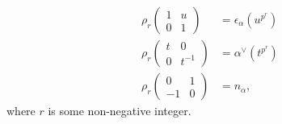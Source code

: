 \begin{align*}
\rho_r\left(\begin{matrix} 1 & u \\ 0 & 1\end{matrix}\right) &= \epsilon_\alpha(u^{p^r}) \\
\rho_r\left(\begin{matrix} t & 0 \\ 0 & t^{-1}\end{matrix}\right) &= \alpha ^\vee(t^{p^r}) \\
\rho_r\left(\begin{matrix} 0 & 1 \\ -1 & 0\end{matrix}\right) &= n_ \alpha,
\end{align*}
where $r$ is some non-negative integer.

